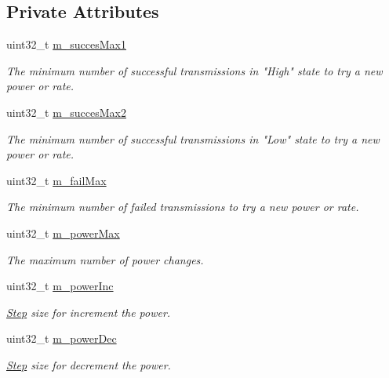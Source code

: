 \subsection*{Private Attributes}
\begin{DoxyCompactItemize}
\item 
uint32\+\_\+t \hyperlink{classns3_1_1AparfWifiManager_ab192aa4160ffefa93e47301ad682ccaa}{m\+\_\+succes\+Max1}
\begin{DoxyCompactList}\small\item\em The minimum number of successful transmissions in "High" state to try a new power or rate. \end{DoxyCompactList}\item 
uint32\+\_\+t \hyperlink{classns3_1_1AparfWifiManager_a8dc983de90c996a4ca0face8366f8bf7}{m\+\_\+succes\+Max2}
\begin{DoxyCompactList}\small\item\em The minimum number of successful transmissions in "Low" state to try a new power or rate. \end{DoxyCompactList}\item 
uint32\+\_\+t \hyperlink{classns3_1_1AparfWifiManager_a1619f19b03ae5c4fc5f9032a71380f3e}{m\+\_\+fail\+Max}
\begin{DoxyCompactList}\small\item\em The minimum number of failed transmissions to try a new power or rate. \end{DoxyCompactList}\item 
uint32\+\_\+t \hyperlink{classns3_1_1AparfWifiManager_a4879816bad5b15bfadc1326a3b636477}{m\+\_\+power\+Max}
\begin{DoxyCompactList}\small\item\em The maximum number of power changes. \end{DoxyCompactList}\item 
uint32\+\_\+t \hyperlink{classns3_1_1AparfWifiManager_aa9276b0b5e0bfdf2b9d81e2c2a46f6a3}{m\+\_\+power\+Inc}
\begin{DoxyCompactList}\small\item\em \hyperlink{structStep}{Step} size for increment the power. \end{DoxyCompactList}\item 
uint32\+\_\+t \hyperlink{classns3_1_1AparfWifiManager_a802d7ed4d81a0f749afd4033950e0c31}{m\+\_\+power\+Dec}
\begin{DoxyCompactList}\small\item\em \hyperlink{structStep}{Step} size for decrement the power. \end{DoxyCompactList}\item 

\end{DoxyCompactItemize}
